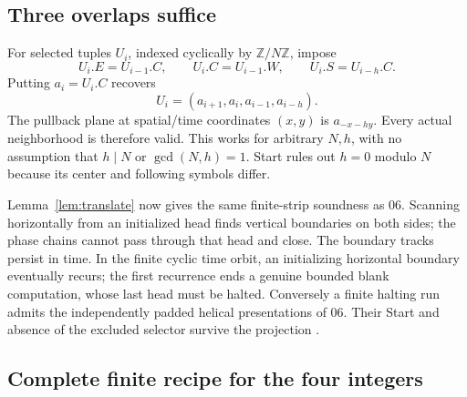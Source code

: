 \documentclass[11pt,a4paper]{article}
\theoremstyle{remark}\newtheorem{remark}[theorem]{Remark}
\newcommand{\Z}{\mathbb Z}
\begin{document}
\subsection{Three overlaps suffice}

For selected tuples $U_i$, indexed cyclically by $\Z/N\Z$, impose
\begin{equation}
 U_i.E=U_{i-1}.C,\qquad
 U_i.C=U_{i-1}.W,\qquad
 U_i.S=U_{i-h}.C. \label{eq:overlaps}
\end{equation}
Putting $a_i=U_i.C$ recovers
\[
 U_i=(a_{i+1},a_i,a_{i-1},a_{i-h}).
\]
The pullback plane at spatial/time coordinates $(x,y)$ is
$a_{-x-hy}$. Every actual neighborhood is therefore valid. This works
for arbitrary $N,h$, with no assumption that $h\mid N$ or
$\gcd(N,h)=1$. Start rules out $h=0$ modulo $N$ because its center
and following symbols differ.

Lemma~\ref{lem:translate} now gives the same finite-strip soundness
as 06. Scanning horizontally from an initialized head finds vertical
boundaries on both sides; the phase chains cannot pass through that
head and close. The boundary tracks persist in time. In the finite
cyclic time orbit, an initializing horizontal boundary eventually
recurs; the first recurrence ends a genuine bounded blank computation,
whose last head must be halted. Conversely a finite halting run admits
the independently padded helical presentations of 06. Their Start
and absence of the excluded selector survive the projection
\cite{blank,helical}.

\subsection{Complete finite recipe for the four integers}
\end{document}
